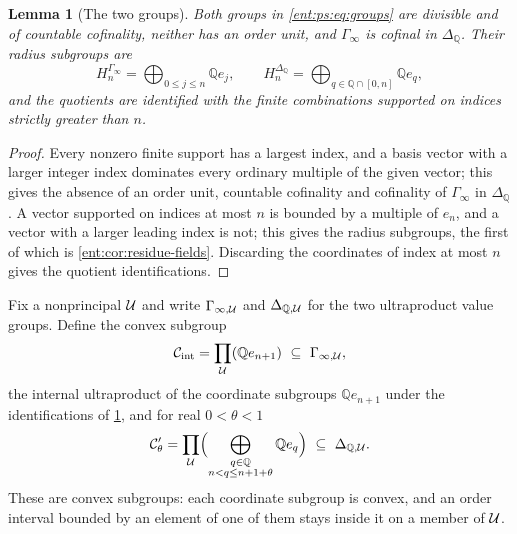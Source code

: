 \documentclass[11pt]{article}
\theoremstyle{plain}
\newtheorem{lemma}[lemma]{Lemma}
\theoremstyle{plain}
\theoremstyle{plain}
\theoremstyle{definition}
\theoremstyle{definition}
\theoremstyle{definition}
\theoremstyle{definition}
\theoremstyle{remark}
\newcommand{\Q}{\mathbb Q}\newcommand{\Z}{\mathbb Z}\newcommand{\N}{\mathbb N}
\begin{document}
\begin{lemma}[The two groups]\label{ent:ps:lem:groups}
Both groups in \eqref{ent:ps:eq:groups} are divisible and of countable
cofinality, neither has an order unit, and $\Gamma_\infty$ is cofinal in
$\Delta_\Q$. Their radius subgroups are
\[
 H_n^{\Gamma_\infty}=\bigoplus_{0\le j\le n}\Q e_j,
 \qquad
 H_n^{\Delta_\Q}=\bigoplus_{q\in\Q\cap[0,n]}\Q e_q ,
\]
and the quotients are identified with the finite combinations supported on
indices strictly greater than $n$.
\end{lemma}
\begin{proof}
Every nonzero finite support has a largest index, and a basis vector with a
larger integer index dominates every ordinary multiple of the given vector;
this gives the absence of an order unit, countable cofinality and cofinality
of $\Gamma_\infty$ in $\Delta_\Q$. A vector supported on indices at most $n$
is bounded by a multiple of $e_n$, and a vector with a larger leading index
is not; this gives the radius subgroups, the first of which is
\cref{ent:cor:residue-fields}. Discarding the coordinates of index at most
$n$ gives the quotient identifications.
\end{proof}

Fix a nonprincipal $\mathcal U$ and write $\Gamma_{\infty,\mathcal U}$ and
$\Delta_{\Q,\Ucal}$ for the two ultraproduct value groups. Define the convex
subgroup
\begin{equation}\label{ent:ps:eq:Cint}
 \mathcal C_{\mathrm{int}}=\prod_\Ucal(\Q e_{n+1})\ \subseteq\
 \Gamma_{\infty,\Ucal},
\end{equation}
the internal ultraproduct of the coordinate subgroups $\Q e_{n+1}$ under the
identifications of \cref{ent:ps:lem:groups}, and for real $0<\theta<1$
\begin{equation}\label{ent:ps:eq:Ctheta}
 \mathcal C'_\theta=\prod_\Ucal\Bigl(\bigoplus_{\substack{q\in\Q\\
   n<q\le n+1+\theta}}\Q e_q\Bigr)\ \subseteq\ \Delta_{\Q,\Ucal}.
\end{equation}
These are convex subgroups: each coordinate subgroup is convex, and an order
interval bounded by an element of one of them stays inside it on a member
of $\mathcal U$.
\end{document}
